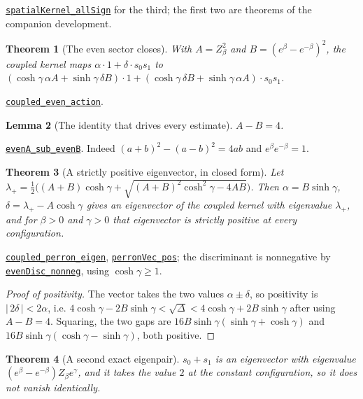\documentclass[11pt]{article}
\newtheorem{theorem}{Theorem}[section]
\newtheorem{lemma}[theorem]{Lemma}
\theoremstyle{definition}
\newcommand{\anchor}{a70426f4c8a0ed733b4eee94fb01b158bc81fd08}
\newcommand{\osline}[3]{%
  \href{https://github.com/lluiseriksson/THE-ERIKSSON-PROGRAMME/blob/\anchor/YangMills/OS/#1.lean\#L#2}{\nolinkurl{#3}}}
\begin{document}
\osline{SpatialPerron}{132}{spatialKernel\_allSign} for the third; the first
two are theorems of the companion development.

\begin{theorem}[The even sector closes]\label{thm:even}
With $A=Z_\beta^2$ and $B=(e^\beta-e^{-\beta})^2$, the coupled kernel maps
$\alpha\cdot1+\delta\cdot s_0s_1$ to
$(\cosh\gamma\,\alpha A+\sinh\gamma\,\delta B)\cdot 1
 +(\cosh\gamma\,\delta B+\sinh\gamma\,\alpha A)\cdot s_0s_1$.
\end{theorem}

\osline{SpatialPerron}{194}{coupled\_even\_action}.

\begin{lemma}[The identity that drives every estimate]\label{lem:AB}
$A-B=4$.
\end{lemma}

\osline{SpatialPerron}{183}{evenA\_sub\_evenB}.  Indeed
$(a+b)^2-(a-b)^2=4ab$ and $e^{\beta}e^{-\beta}=1$.

\begin{theorem}[A strictly positive eigenvector, in closed form]\label{thm:vacuum}
Let $\lambda_+=\tfrac12\bigl((A+B)\cosh\gamma+\sqrt{(A+B)^2\cosh^2\gamma-4AB}\bigr)$.
Then $\alpha=B\sinh\gamma$, $\delta=\lambda_+-A\cosh\gamma$ gives an
eigenvector of the coupled kernel with eigenvalue $\lambda_+$, and for
$\beta>0$ and $\gamma>0$ that eigenvector is strictly positive at every
configuration.
\end{theorem}

\osline{SpatialPerron}{249}{coupled\_perron\_eigen},
\osline{SpatialPerron}{261}{perronVec\_pos}; the discriminant is nonnegative
by \osline{SpatialPerron}{216}{evenDisc\_nonneg}, using $\cosh\gamma\ge1$.

\begin{proof}[Proof of positivity]
The vector takes the two values $\alpha\pm\delta$, so positivity is
$|\,2\delta\,|<2\alpha$, i.e.
$4\cosh\gamma-2B\sinh\gamma<\sqrt{\Delta}<4\cosh\gamma+2B\sinh\gamma$ after
using $A-B=4$.  Squaring, the two gaps are
$16B\sinh\gamma(\sinh\gamma+\cosh\gamma)$ and
$16B\sinh\gamma(\cosh\gamma-\sinh\gamma)$, both positive.
\end{proof}

\begin{theorem}[A second exact eigenpair]\label{thm:odd}
$s_0+s_1$ is an eigenvector with eigenvalue
$(e^\beta-e^{-\beta})Z_\beta e^{\gamma}$, and it takes the value $2$ at the
constant configuration, so it does not vanish identically.
\end{theorem}
\end{document}

